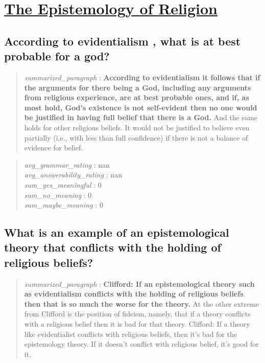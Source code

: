 \hypertarget{the-epistemology-of-religion}{%
\section{\texorpdfstring{\href{https://plato.stanford.edu/entries/religion-epistemology/index.html}{The
Epistemology of
Religion}}{The Epistemology of Religion}}\label{the-epistemology-of-religion}}

\hypertarget{according-to-evidentialism-what-is-at-best-probable-for-a-god}{%
\subsection{According to evidentialism , what is at best probable for a
god?}\label{according-to-evidentialism-what-is-at-best-probable-for-a-god}}

\begin{quote}
\emph{summarized\_paragraph} : \textbf{According to evidentialism it
follows that if the arguments for there being a God, including any
arguments from religious experience, are at best probable ones, and if,
as most hold, God's existence is not self-evident then no one would be
justified in having full belief that there is a God.} And the same holds
for other religious beliefs. It would not be justified to believe even
partially (i.e., with less than full confidence) if there is not a
balance of evidence for belief.
\end{quote}

\begin{quote}
\emph{avg\_grammar\_rating} : nan\\
\emph{avg\_answerability\_rating} : nan\\
\emph{sum\_yes\_meaningful} : 0\\
\emph{sum\_no\_meaning} : 0\\
\emph{sum\_maybe\_meaning} : 0
\end{quote}

\hypertarget{what-is-an-example-of-an-epistemological-theory-that-conflicts-with-the-holding-of-religious-beliefs}{%
\subsection{What is an example of an epistemological theory that
conflicts with the holding of religious
beliefs?}\label{what-is-an-example-of-an-epistemological-theory-that-conflicts-with-the-holding-of-religious-beliefs}}

\begin{quote}
\emph{summarized\_paragraph} : \textbf{Clifford: If an epistemological
theory such as evidentialism conflicts with the holding of religious
beliefs then that is so much the worse for the theory.} At the other
extreme from Clifford is the position of fideism, namely, that if a
theory conflicts with a religious belief then it is bad for that theory.
Clifford: If a theory like evidentialist conflicts with religious
beliefs, then it's bad for the epistemology theory. If it doesn't
conflict with religious belief, it's good for it.
\end{quote}

